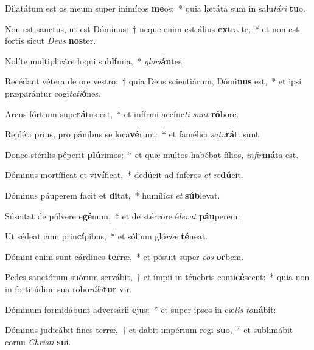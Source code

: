 \item Dilatátum est os meum super inimícos \textbf{me}os:~* quia lætáta sum in salu\textit{tá}\textit{ri} \textbf{tu}o.
\item Non est sanctus, ut est Dóminus:~† neque enim est álius \textbf{ex}tra te,~* et non est fortis sicut \textit{De}\textit{us} \textbf{nos}ter.
\item Nolíte multiplicáre loqui sub\textbf{lí}mia,~* \textit{glo}\textit{ri}\textbf{án}tes:
\item Recédant vétera de ore vestro:~† quia Deus scientiárum, Dómi\textbf{nus} est,~* et ipsi præparántur cogi\textit{ta}\textit{ti}\textbf{ó}nes.
\item Arcus fórtium supe\textbf{rá}tus est,~* et infírmi accínc\textit{ti} \textit{sunt} \textbf{ró}bore.
\item Repléti prius, pro pánibus se loca\textbf{vé}runt:~* et famélici \textit{sa}\textit{tu}\textbf{rá}ti sunt.
\item Donec stérilis péperit \textbf{plú}rimos:~* et quæ multos habébat fílios, \textit{in}\textit{fir}\textbf{má}ta est.
\item Dóminus mortíficat et vi\textbf{ví}ficat,~* dedúcit ad ínferos \textit{et} \textit{re}\textbf{dú}cit.
\item Dóminus páuperem facit et \textbf{di}tat,~* humíli\textit{at} \textit{et} \textbf{súb}levat.
\item Súscitat de púlvere e\textbf{gé}num,~* et de stércore é\textit{le}\textit{vat} \textbf{páu}perem:
\item Ut sédeat cum prin\textbf{cí}pibus,~* et sólium gló\textit{ri}\textit{æ} \textbf{té}neat.
\item Dómini enim sunt cárdines \textbf{ter}ræ,~* et pósuit super \textit{e}\textit{os} \textbf{or}bem.
\item Pedes sanctórum suórum servábit,~† et ímpii in ténebris conti\textbf{cé}scent:~* quia non in fortitúdine sua robo\textit{rá}\textit{bi}\textbf{tur} vir.
\item Dóminum formidábunt adversárii \textbf{e}jus:~* et super ipsos in cæ\textit{lis} \textit{to}\textbf{ná}bit:
\item Dóminus judicábit fines terræ,~† et dabit impérium regi \textbf{su}o,~* et sublimábit cornu \textit{Chris}\textit{ti} \textbf{su}i.
